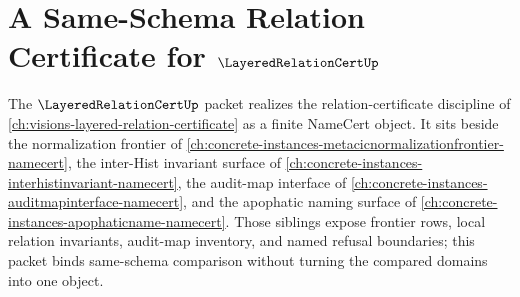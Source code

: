 \chapter{A Same-Schema Relation Certificate for $\LayeredRelationCertUp$}
\label{ch:concrete-instances-layeredrelationcert-sameschema-namecert}

The $\LayeredRelationCertUp$ packet realizes the relation-certificate discipline of \autoref{ch:visions-layered-relation-certificate} as a finite NameCert object. It sits beside the normalization frontier of \autoref{ch:concrete-instances-metacicnormalizationfrontier-namecert}, the inter-Hist invariant surface of \autoref{ch:concrete-instances-interhistinvariant-namecert}, the audit-map interface of \autoref{ch:concrete-instances-auditmapinterface-namecert}, and the apophatic naming surface of \autoref{ch:concrete-instances-apophaticname-namecert}. Those siblings expose frontier rows, local relation invariants, audit-map inventory, and named refusal boundaries; this packet binds same-schema comparison without turning the compared domains into one object.

